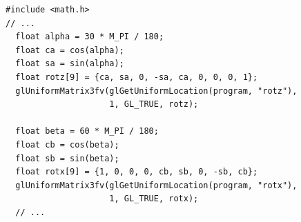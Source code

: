 \documentclass[calcdimensions,landscape,letterpaper]{powersem}
\newcommand{\thecurrentheading}{}
\newcommand{\heading}[1]{\renewcommand{\thecurrentheading}{#1}}
\begin{document}
\begin{slide}
    \heading{Uniform Matrices}
    \begin{center}
        \begin{minipage}[c]{.95\textwidth}
            \begin{verbatim}
#include <math.h>
// ...
  float alpha = 30 * M_PI / 180;
  float ca = cos(alpha);
  float sa = sin(alpha);
  float rotz[9] = {ca, sa, 0, -sa, ca, 0, 0, 0, 1};
  glUniformMatrix3fv(glGetUniformLocation(program, "rotz"),
                     1, GL_TRUE, rotz);

  float beta = 60 * M_PI / 180;
  float cb = cos(beta);
  float sb = sin(beta);
  float rotx[9] = {1, 0, 0, 0, cb, sb, 0, -sb, cb};
  glUniformMatrix3fv(glGetUniformLocation(program, "rotx"),
                     1, GL_TRUE, rotx);
  // ...
            \end{verbatim}
        \end{minipage}
    \end{center}
\end{slide}

\begin{slide}
    \heading{Rotated Quad}
    \begin{center}
    \end{center}
\end{slide}
\end{document}
